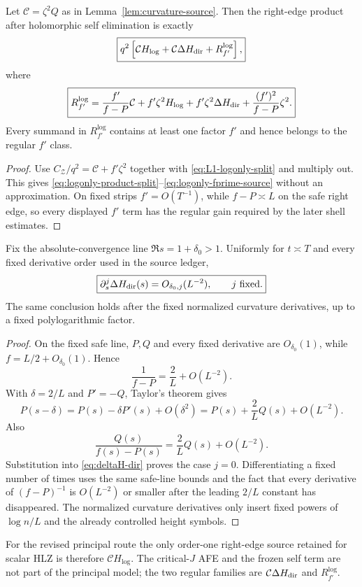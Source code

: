 \begin{lemma}
\label{lem:logonly-fprime-separation}
Let $\mathcal C=\zeta^2Q$ as in Lemma~\ref{lem:curvature-source}.  Then the
right-edge product after holomorphic self elimination is exactly
\begin{equation}
\boxed{
q^2\left[
 \mathcal C H_{\log}
 +\mathcal C\Delta H_{\rm dir}
 +R_{f'}^{\log}
\right],
}
\label{eq:logonly-product-split}
\end{equation}
where
\begin{equation}
\boxed{
R_{f'}^{\log}
=\frac{f'}{f-P}\mathcal C
 +f'\zeta^2H_{\log}
 +f'\zeta^2\Delta H_{\rm dir}
 +\frac{(f')^2}{f-P}\zeta^2.
}
\label{eq:logonly-fprime-source}
\end{equation}
Every summand in $R_{f'}^{\log}$ contains at least one factor $f'$ and hence
belongs to the regular $f'$ class.
\end{lemma}

\begin{proof}
Use
$C_{\mathscr Z}/q^2=\mathcal C+f'\zeta^2$ together with
\eqref{eq:L1-logonly-split} and multiply out.  This gives
\eqref{eq:logonly-product-split}--\eqref{eq:logonly-fprime-source} without an
approximation.  On fixed strips $f'=O(T^{-1})$, while $f-P\asymp L$ on the
safe right edge, so every displayed $f'$ term has the regular gain required by
the later shell estimates.
\end{proof}

\begin{lemma}
\label{lem:deltaH-dir-small}
Fix the absolute-convergence line $\Re s=1+\delta_0>1$.  Uniformly for
$t\asymp T$ and every fixed derivative order used in the source ledger,
\begin{equation}
\boxed{
\partial_s^j\Delta H_{\rm dir}(s)=O_{\delta_0,j}(L^{-2}),
\qquad j\ \text{fixed}.
}
\label{eq:deltaH-dir-small}
\end{equation}
The same conclusion holds after the fixed normalized curvature derivatives,
up to a fixed polylogarithmic factor.
\end{lemma}

\begin{proof}
On the fixed safe line, $P,Q$ and every fixed derivative are $O_{\delta_0}(1)$,
while $f=L/2+O_{\delta_0}(1)$.  Hence
\[
\frac1{f-P}=\frac2L+O(L^{-2}).
\]
With $\delta=2/L$ and $P'=-Q$, Taylor's theorem gives
\[
P(s-\delta)=P(s)-\delta P'(s)+O(\delta^2)
           =P(s)+\frac2LQ(s)+O(L^{-2}).
\]
Also
\[
\frac{Q(s)}{f(s)-P(s)}=\frac2LQ(s)+O(L^{-2}).
\]
Substitution into \eqref{eq:deltaH-dir} proves the case $j=0$.
Differentiating a fixed number of times uses the same safe-line bounds and the
fact that every derivative of $(f-P)^{-1}$ is $O(L^{-2})$ or smaller after the
leading $2/L$ constant has disappeared.  The normalized curvature derivatives
only insert fixed powers of $\log n/L$ and the already controlled height
symbols.
\end{proof}

For the revised principal route the only order-one right-edge source retained
for scalar HLZ is therefore $\mathcal C H_{\log}$.  The critical-$J$ AFE and
the frozen self term are not part of the principal model; the two regular
families are $\mathcal C\Delta H_{\rm dir}$ and
$R_{f'}^{\log}$.